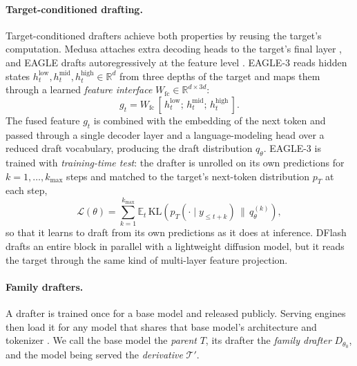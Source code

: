 \documentclass[11pt]{article}
\newcommand{\Tp}{\mathcal{T}'}
\begin{document}
\paragraph{Target-conditioned drafting.}
Target-conditioned drafters achieve both properties by reusing the target's computation.
Medusa attaches extra decoding heads to the target's final layer \citep{cai2024medusa}, and EAGLE drafts autoregressively at the feature level \citep{li2024eagle,li2024eagle2}.
EAGLE-3 \citep{li2025eagle3} reads hidden states $h^{\text{low}}_t, h^{\text{mid}}_t, h^{\text{high}}_t \in \mathbb{R}^{d}$ from three depths of the target and maps them through a learned \emph{feature interface} $W_{\text{fc}} \in \mathbb{R}^{d \times 3d}$:
\begin{equation}
  g_t = W_{\text{fc}}\,[\,h^{\text{low}}_t ;\, h^{\text{mid}}_t ;\, h^{\text{high}}_t\,].
  \label{eq:interface}
\end{equation}
The fused feature $g_t$ is combined with the embedding of the next token and passed through a single decoder layer and a language-modeling head over a reduced draft vocabulary, producing the draft distribution $q_\theta$.
EAGLE-3 is trained with \emph{training-time test}: the drafter is unrolled on its own predictions for $k=1,\dots,k_{\max}$ steps and matched to the target's next-token distribution $p_T$ at each step,
\begin{equation}
  \mathcal{L}(\theta) = \sum_{k=1}^{k_{\max}} \mathbb{E}_{t}\, \mathrm{KL}\!\left(p_{T}(\cdot \mid y_{\le t+k}) \,\big\|\, q^{(k)}_\theta\right),
  \label{eq:ttt}
\end{equation}
so that it learns to draft from its own predictions as it does at inference.
DFlash \citep{chen2026dflash} drafts an entire block in parallel with a lightweight diffusion model, but it reads the target through the same kind of multi-layer feature projection.

\paragraph{Family drafters.}
A drafter is trained once for a base model and released publicly.
Serving engines then load it for any model that shares that base model's architecture and tokenizer \citep{kwon2023vllm,redhat2025speculators}.
We call the base model the \emph{parent} $T$, its drafter the \emph{family drafter} $D_{\theta_0}$, and the model being served the \emph{derivative} $\Tp$.

\end{document}
